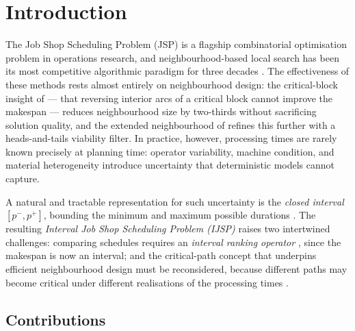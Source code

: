 \documentclass[preprint,12pt]{elsarticle}
\begin{document}

\section{Introduction}
\label{sec:intro}

The Job Shop Scheduling Problem (JSP) is a flagship combinatorial optimisation problem in operations research, and neighbourhood-based local search has been its most competitive algorithmic paradigm for three decades \cite{vanLaarhoven1992,Nowicki1996,Nowicki2005}. The effectiveness of these methods rests almost entirely on neighbourhood design: the critical-block insight of \cite{Nowicki1996} --- that reversing interior arcs of a critical block cannot improve the makespan --- reduces neighbourhood size by two-thirds without sacrificing solution quality, and the extended neighbourhood of \cite{Nowicki2005} refines this further with a heads-and-tails viability filter. In practice, however, processing times are rarely known precisely at planning time: operator variability, machine condition, and material heterogeneity introduce uncertainty that deterministic models cannot capture.

A natural and tractable representation for such uncertainty is the \emph{closed interval} $[p^-, p^+]$, bounding the minimum and maximum possible durations \cite{Moore2009,Lei2012c}. The resulting \emph{Interval Job Shop Scheduling Problem (IJSP)} raises two intertwined challenges: comparing schedules requires an \emph{interval ranking operator} \cite{Bustince2013,Karmakar2012}, since the makespan is now an interval; and the critical-path concept that underpins efficient neighbourhood design must be reconsidered, because different paths may become critical under different realisations of the processing times \cite{Dubois2003,Artigues2015,GonzalezRodriguez2008}.

\subsection{Contributions}
\label{sec:contributions}
\end{document}
